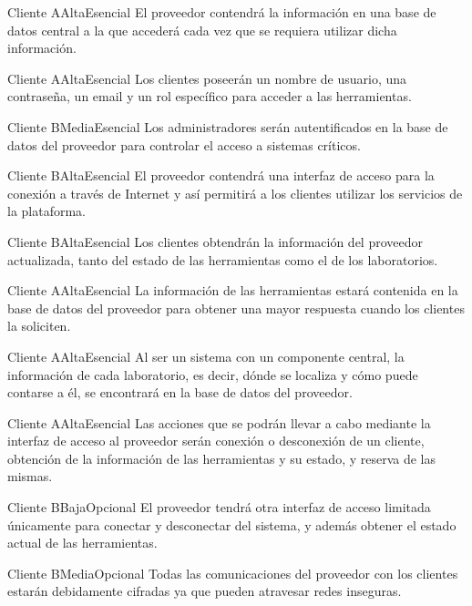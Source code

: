 {Cliente A}{Alta}{Esencial}
{
El proveedor contendrá la información en una base de datos central a la 
que accederá cada vez que se requiera utilizar dicha información.
}

{Cliente A}{Alta}{Esencial}
{
Los clientes poseerán un nombre de usuario, una contraseña, un 
email y un rol específico para acceder a las herramientas.
}

{Cliente B}{Media}{Esencial}
{
Los administradores serán autentificados en la base de datos del 
proveedor para controlar el acceso a sistemas críticos.
}

{Cliente B}{Alta}{Esencial}
{
El proveedor contendrá una interfaz de acceso para la conexión a 
través de Internet y así permitirá a los clientes utilizar los 
servicios de la plataforma.
}

{Cliente B}{Alta}{Esencial}
{
Los clientes obtendrán la información del proveedor actualizada, tanto 
del estado de las herramientas como el de los laboratorios.
}

{Cliente A}{Alta}{Esencial}
{
La información de las herramientas estará contenida en la base de datos 
del proveedor para obtener una mayor respuesta cuando los clientes la 
soliciten.
}

{Cliente A}{Alta}{Esencial}
{
Al ser un sistema con un componente central, la información de cada 
laboratorio, es decir, dónde se localiza y cómo puede contarse a él, 
se encontrará en la base de datos del proveedor.
}

{Cliente A}{Alta}{Esencial}
{
Las acciones que se podrán llevar a cabo mediante la interfaz de 
acceso al proveedor serán conexión o desconexión de un cliente, 
obtención de la información de las herramientas y su estado, y 
reserva de las mismas.
}

{Cliente B}{Baja}{Opcional}
{
El proveedor tendrá otra interfaz de acceso limitada únicamente para 
conectar y desconectar del sistema, y además obtener el estado actual 
de las herramientas.
}

{Cliente B}{Media}{Opcional}
{
Todas las comunicaciones del proveedor con los clientes estarán 
debidamente cifradas ya que pueden atravesar redes inseguras.
}

